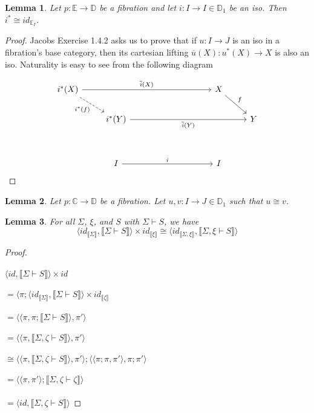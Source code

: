 \documentclass{article}
\newtheorem{lemma}{Lemma}
\newcommand{\sem}[1]{\llbracket #1 \rrbracket}
\begin{document}
\begin{lemma}
Let $p : \mathbb E \to \mathbb D$ be a fibration and let $i : I \to I \in \mathbb D_1$ be an iso. Then $i^* \cong \mathit{id}_{\mathbb E_I}$. 
\end{lemma}

\begin{proof}
Jacobs Exercise 1.4.2 asks us to prove that if $u : I \to J$ is an iso in a fibration's base category, then its cartesian lifting $\overline{u}(X) : u^*(X) \to X$ is also an iso. Naturality is easy to see from the following diagram

\[\begin{tikzcd}
	{i^*(X)} &&&&& X \\
	& {i^*(Y)} &&&&& Y \\
	\\
	& I &&&& I
	\arrow["i", from=4-2, to=4-6]
	\arrow["{i^*(f)}"', dashed, from=1-1, to=2-2]
	\arrow["{\overline{i}(Y)}"', from=2-2, to=2-7]
	\arrow["{\overline{i}(X)}", from=1-1, to=1-6]
	\arrow["f", from=1-6, to=2-7]
\end{tikzcd}\]

\end{proof}

\begin{lemma}
Let $p : \mathbb C \to \mathbb D$ be a fibration. Let $u,v : I \to J \in \mathbb D_1$ such that $u \cong v$.
\end{lemma}

\begin{lemma}
For all $\Sigma$, $\xi$, and $S$ with $\Sigma \vdash S$,  we have $$\langle \mathit{id}_{\sem \Sigma}, \sem{\Sigma \vdash S} \rangle \times \mathit{id}_{\sem{\xi}} \cong \langle \mathit{id}_{\sem{\Sigma,\xi}}, \sem{\Sigma,\xi \vdash S} \rangle$$
\label{lemma:subswap}
\end{lemma}

\begin{proof}~\\~\\
$\langle \mathit{id}, \sem{\Sigma \vdash S} \rangle \times \mathit{id}$\\~\\
$= \langle \pi ; \langle \mathit{id}_{\sem{\Sigma}} , \sem{\Sigma \vdash S} \rangle \times \mathit{id}_{\sem{\zeta}}$\\~\\
$= \langle \langle \pi, \pi;\sem{\Sigma \vdash S} \rangle, \pi' \rangle$\\~\\
$= \langle \langle \pi, \sem{\Sigma,\zeta \vdash S} \rangle, \pi' \rangle$\\~\\
$\cong \langle \langle \pi, \sem{\Sigma,\zeta \vdash S} \rangle, \pi' \rangle; \langle \langle \pi;\pi,\pi' \rangle, \pi;\pi' \rangle$\\~\\
$= \langle \langle \pi, \pi' \rangle; \sem{\Sigma, \zeta \vdash \zeta} \rangle $\\~\\
$= \langle \mathit{id}, \sem{\Sigma,\zeta \vdash S} \rangle$

\end{proof}
\end{document}
